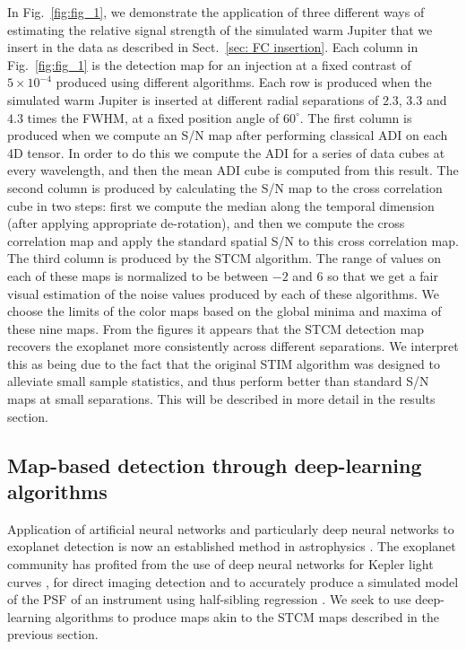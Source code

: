 \documentclass{aa}
\begin{document}
In Fig.~\ref{fig:fig_1}, we demonstrate the application of three different ways of estimating the relative signal strength of the simulated warm Jupiter that we insert in the data as described in Sect.~\ref{sec: FC insertion}.
Each column in Fig.~\ref{fig:fig_1} is the detection map for an injection at a fixed contrast of $5\times 10^{-4}$ produced using different algorithms. %
Each row is produced when the simulated warm Jupiter is inserted at different radial separations of $2.3$, $3.3$ and $4.3$ times the FWHM, at a fixed position angle of $60^{\circ}$.
The first column is produced when we compute an S/N map \citep[as defined in][]{2014Mawet} after performing classical ADI on each 4D tensor.
In order to do this we compute the ADI for a series of data cubes at every wavelength, and then the mean ADI cube is computed from this result. 
The second column is produced by calculating the S/N map \citep[as defined in][]{2014Mawet} to the cross correlation cube in two steps: first we compute the median along the temporal dimension (after applying appropriate de-rotation), and then we compute the cross correlation map and apply the standard spatial S/N to this cross correlation map.
The third column is produced by the STCM algorithm.
The range of values on each of these maps is normalized to be between $-2$ and $6$ so that we get a fair visual estimation of the noise values produced by each of these algorithms.
We choose the limits of the color maps based on the global minima and maxima of these nine maps.
From the figures it appears that the STCM detection map recovers the exoplanet more consistently across different separations. We interpret this as being due to the fact that the original STIM algorithm was designed to alleviate small sample statistics, and thus perform better than standard S/N maps at small separations.
This will be described in more detail in the results section.

\subsection{Map-based detection through deep-learning algorithms}\label{sec:ML algorithms}

Application of artificial neural networks and particularly deep neural networks to exoplanet detection is now an established method in astrophysics \cite{2020Fluke}.
The exoplanet community has profited from the use of deep neural networks for Kepler light curves \cite{2018Pearson}, for direct imaging detection \cite{2018Gomez} and to accurately produce a simulated model of the PSF of an instrument using half-sibling regression \citep{2022Gebhard}.
We seek to use deep-learning algorithms to produce maps akin to the STCM maps described in the previous section.
\end{document}
